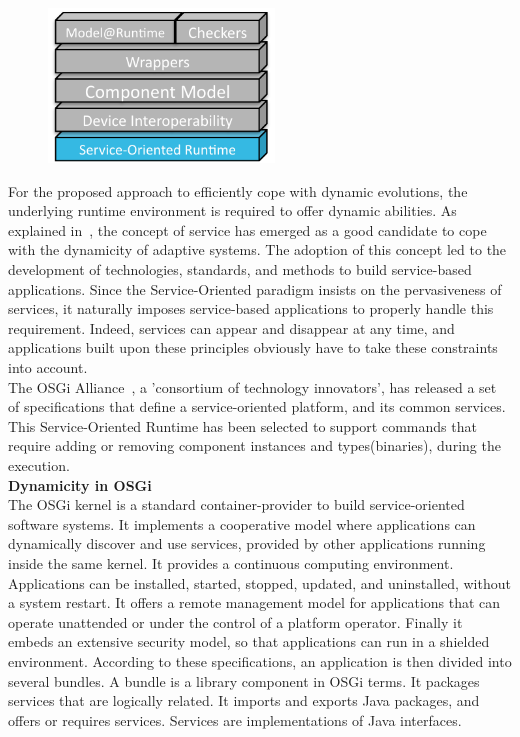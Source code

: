 \begin{figure}
  \vspace{-5mm}
  \includegraphics[width=60mm]{part2/pics/layers/SoaRt}
  \vspace{-5mm}
\end{figure}

For the proposed approach to efficiently cope with dynamic evolutions, the underlying runtime environment is required to offer dynamic abilities. As explained in~\cite{Di-Nitto:2008}, the concept of service has emerged as a good candidate to cope with the dynamicity of adaptive systems. The adoption of this concept led to the development of technologies, standards, and methods to build service-based applications. Since the Service-Oriented paradigm insists on the pervasiveness of services, it naturally imposes service-based applications to properly handle this requirement. Indeed, services can appear and disappear at any time, and applications built upon these principles obviously have to take these constraints into account.\\

The OSGi Alliance~\cite{OSGI:r4}, a 'consortium of technology innovators', has released a set of specifications that define a service-oriented platform, and its common services. This Service-Oriented Runtime has been selected to support commands that require adding or removing component instances and types(binaries), during the execution.\\

{\bf Dynamicity in OSGi}\\
The OSGi kernel is a standard container-provider to build service-oriented software systems. It implements a cooperative model where applications can dynamically discover and use services, provided by other applications running inside the same kernel. It provides a continuous computing environment. Applications can be installed, started, stopped, updated, and uninstalled, without a system restart. It offers a remote management model for applications that can operate unattended or under the control of a platform operator. Finally it embeds an extensive security model, so that applications can run in a shielded environment. According to these specifications, an application is then divided into several bundles. A bundle is a library component in OSGi terms. It packages services that are logically related. It imports and exports Java packages, and offers or requires services. Services are implementations of Java interfaces.\\

